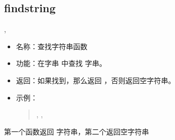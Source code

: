 \documentclass[a4paper,10pt]{sphinxmanual}
\begin{document}
\subsection{findstring}
\label{\detokenize{functions:findstring}}
\begin{sphinxVerbatim}[commandchars=\\\{\}]
 \PYGZlt{}\PYGZgt{},\PYGZlt{}\PYGZgt{}
\end{sphinxVerbatim}
\begin{itemize}
\item {} 
名称：查找字符串函数

\item {} 
功能：在字串  中查找  字串。

\item {} 
返回：如果找到，那么返回  ，否则返回空字符串。

\item {} 
示例：
\begin{quote}

\begin{sphinxVerbatim}[commandchars=\\\{\}]
 ,  
 , 
\end{sphinxVerbatim}
\end{quote}

\end{itemize}

第一个函数返回  字符串，第二个返回空字符串
\end{document}
